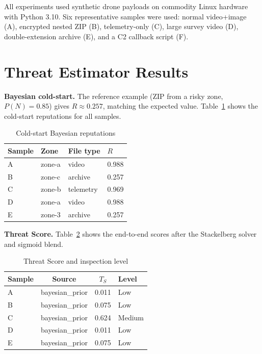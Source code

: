 \documentclass[12pt, a4paper]{report}
\begin{document}
All experiments used synthetic drone payloads on commodity Linux
hardware with Python 3.10. Six representative samples were used:
normal video+image (A), encrypted nested ZIP (B), telemetry-only (C),
large survey video (D), double-extension archive (E), and a C2
callback script (F).

\section{Threat Estimator Results}

\textbf{Bayesian cold-start.}
The reference example (ZIP from a risky zone, $P(N) = 0.85$)
gives $R \approx 0.257$, matching the expected value.
Table~\ref{tab:gte_bayes} shows the cold-start reputations for all
samples.

\begin{table}[H]
\centering
\caption{Cold-start Bayesian reputations}
\label{tab:gte_bayes}
\begin{tabular}{@{}llll@{}}
\toprule
\textbf{Sample} & \textbf{Zone} & \textbf{File type} & \textbf{$R$} \\
\midrule
A & zone-a & video & 0.988 \\
B & zone-c & archive & 0.257 \\
C & zone-b & telemetry & 0.969 \\
D & zone-a & video & 0.988 \\
E & zone-3 & archive & 0.257 \\
\bottomrule
\end{tabular}
\end{table}

\textbf{Threat Score.}
Table~\ref{tab:gte_results} shows the end-to-end scores after the
Stackelberg solver and sigmoid blend.

\begin{table}[H]
\centering
\caption{Threat Score and inspection level}
\label{tab:gte_results}
\begin{tabular}{@{}lccl@{}}
\toprule
\textbf{Sample} & \textbf{Source} & \textbf{$T_S$} & \textbf{Level} \\
\midrule
A & bayesian\_prior & 0.011 & Low \\
B & bayesian\_prior & 0.075 & Low \\
C & bayesian\_prior & 0.624 & Medium \\
D & bayesian\_prior & 0.011 & Low \\
E & bayesian\_prior & 0.075 & Low \\
\bottomrule
\end{tabular}
\end{table}
\end{document}
